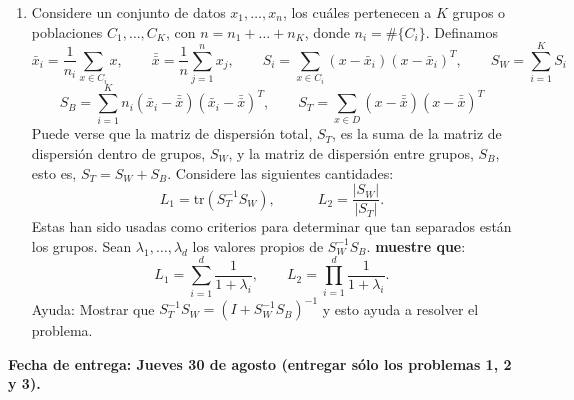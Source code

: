 \documentclass{article}
\begin{document}
\begin{sf}
\begin{enumerate}
\bigskip


\item Considere un conjunto de datos $x_1,\ldots,x_n$,
los cu\'ales pertenecen a $K$ grupos o poblaciones $C_1,\ldots,C_K$, con $n=n_1+\ldots+n_K$, donde
$n_i = \# \{C_i\}$. Definamos
$$\bar{x}_i = \frac{1}{n_i}\sum_{x \in C_i} x, 
\qquad \bar{\bar{x}} = \frac{1}{n} \sum_{j=1}^n x_j, 
\qquad S_i = \sum_{x \in C_i} (x-\bar{x}_i)(x-\bar{x}_i)^T, 
\qquad S_W = \sum_{i=1}^K S_i$$
$$S_B = \sum_{i=1}^K n_i (\bar{x}_i-\bar{\bar{x}})(\bar{x}_i-\bar{\bar{x}})^T,
\qquad S_T = \sum_{x \in D} (x-\bar{\bar{x}})(x-\bar{\bar{x}})^T$$
Puede verse que la matriz de dispersi\'on total, $S_T$,  es la suma de la matriz 
de dispersi\'on dentro de grupos, $S_W$, y la matriz de dispersi\'on entre grupos, $S_B$,
esto es, $S_T = S_W+S_B.$
Considere las siguientes cantidades: 
$$L_1 = \text{tr}\left( S_T^{-1}S_W \right), \quad \qquad L_2 = \frac{|S_W|}{|S_T|}.$$
Estas han sido usadas como criterios para determinar
que tan separados est\'an los grupos. Sean $\lambda_1,\ldots,\lambda_d$ los valores propios de $S_W^{-1}S_B$.
\textbf{muestre que}:
$$L_1 = \sum_{i=1}^d \frac{1}{1+\lambda_i}, \qquad L_2 = \prod_{i=1}^d \frac{1}{1+\lambda_i}.$$
Ayuda: Mostrar que $S_T^{-1}S_W = (I+S_W^{-1}S_B)^{-1}$ y esto ayuda a resolver el problema. 

\end{enumerate}

\bigskip

\underline{\hspace{15cm}}

\bigskip

\noindent \textbf{Fecha de entrega: Jueves 30 de agosto (entregar s\'olo los problemas 1, 2 y 3).}




\end{sf}
\end{document}
